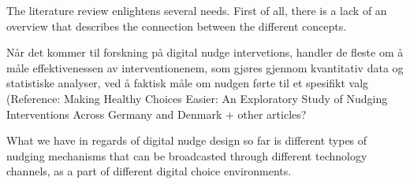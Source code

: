 The literature review enlightens several needs. First of all, there is a lack of an overview that describes the connection between the different concepts.

Når det kommer til forskning på digital nudge intervetions, handler de fleste om å måle effektivenessen av interventionenem, som gjøres gjennom kvantitativ data og statistiske analyser, ved å faktisk måle om nudgen førte til et spesifikt valg (Reference: Making Healthy Choices Easier: An Exploratory Study of Nudging Interventions Across Germany and Denmark + other articles?

What we have in regards of digital nudge design so far is different types of nudging mechanisms that can be broadcasted through different technology channels, as a part of different digital choice environments.